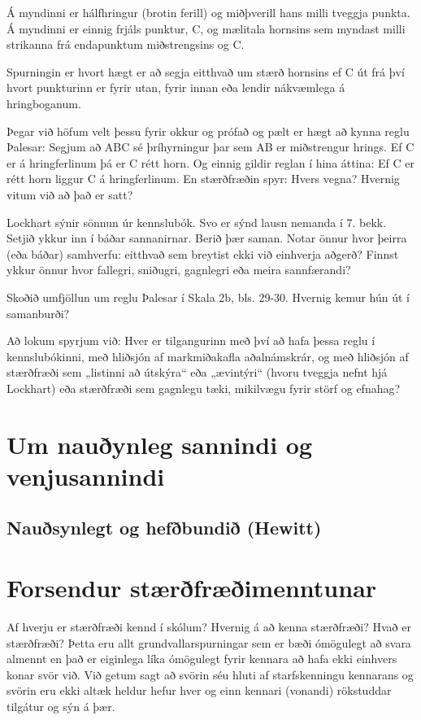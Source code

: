\documentclass[
  icelandic,
]{book}
\begin{document}
Á myndinni er hálfhringur (brotin ferill) og miðþverill hans milli tveggja punkta. Á myndinni er einnig frjáls punktur, C, og mælitala hornsins sem myndast milli strikanna frá endapunktum miðstrengsins og C.

Spurningin er hvort hægt er að segja eitthvað um stærð hornsins ef C út frá því hvort punkturinn er fyrir utan, fyrir innan eða lendir nákvæmlega á hringboganum.

Þegar við höfum velt þessu fyrir okkur og prófað og pælt er hægt að kynna reglu Þalesar: Segjum að ABC sé þríhyrningur þar sem AB er miðstrengur hrings. Ef C er á hringferlinum þá er C rétt horn. Og einnig gildir reglan í hina áttina: Ef C er rétt horn liggur C á hringferlinum. En stærðfræðin spyr: Hvers vegna? Hvernig vitum við að það er satt?

Lockhart sýnir sönnun úr kennslubók. Svo er sýnd lausn nemanda í 7. bekk. Setjið ykkur inn í báðar sannanirnar. Berið þær saman. Notar önnur hvor þeirra (eða báðar) samhverfu: eitthvað sem breytist ekki við einhverja aðgerð? Finnst ykkur önnur hvor fallegri, sniðugri, gagnlegri eða meira sannfærandi?

Skoðið umfjöllun um reglu Þalesar í Skala 2b, bls. 29-30. Hvernig kemur hún út í samanburði?

Að lokum spyrjum við: Hver er tilgangurinn með því að hafa þessa reglu í kennslubókinni, með hliðsjón af markmiðakafla aðalnámskrár, og með hliðsjón af stærðfræði sem „listinni að útskýra`` eða „ævintýri`` (hvoru tveggja nefnt hjá Lockhart) eða stærðfræði sem gagnlegu tæki, mikilvægu fyrir störf og efnahag?

\chapter{Um nauðynleg sannindi og venjusannindi}\label{naudsyn_venjur}

\section{Nauðsynlegt og hefðbundið (Hewitt)}\label{abitrary-necessary}

\chapter{Forsendur stærðfræðimenntunar}\label{forsendur-staemenntunar}

Af hverju er stærðfræði kennd í skólum? Hvernig á að kenna stærðfræði? Hvað er stærðfræði? Þetta eru allt grundvallarspurningar sem er bæði ómögulegt að svara almennt en það er eiginlega líka ómögulegt fyrir kennara að hafa ekki einhvers konar svör við. Við getum sagt að svörin séu hluti af starfskenningu kennarans og svörin eru ekki altæk heldur hefur hver og einn kennari (vonandi) rökstuddar tilgátur og sýn á þær.
\end{document}
